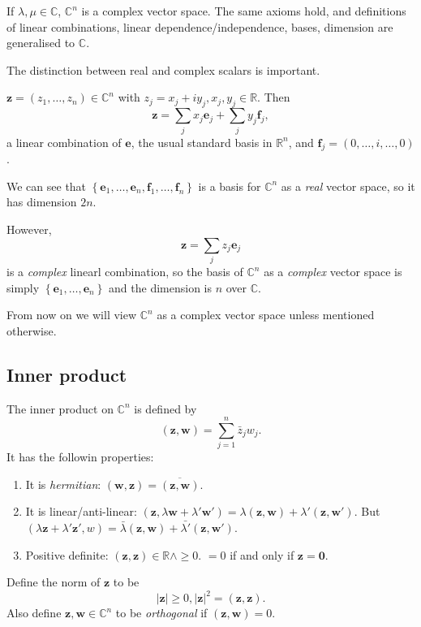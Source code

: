 \documentclass[10pt]{article}
\def\ge{\geqslant}
\begin{document}
    If $ \lambda, \mu\in \mathbb{C}  $, $ \mathbb{C}^n $ is a complex vector space. The same axioms hold, and definitions of linear combinations, linear dependence/independence, bases, dimension are generalised to $\mathbb{C}$.

    The distinction between real and complex scalars is important.
    \begin{example}
        $ \mathbf{z}=(z_1,\dots,z_n)\in \mathbb{C}^{n} $ with $ z_j=x_j+iy_j, x_j, y_j \in \mathbb{R} $. Then 
        \[
            \mathbf{z}=\sum_{j} x_j \mathbf{e}_j + \sum_{j} y_j \mathbf{f}_j,
        \]
        a linear combination of $ \mathbf{e} $, the usual standard basis in $\mathbb{R}^{n}$, and $ \mathbf{f}_j=(0,\dots,i,\dots,0) $.
    \end{example}
    We can see that $ \left\{ \mathbf{e}_1,\dots,\mathbf{e}_n,\mathbf{f}_1,\dots,\mathbf{f}_n\right\} $ is a basis for $\mathbb{C}^{n}$ as a \textit{real} vector space, so it has dimension $2n$.
    
    However,
    \[
        \mathbf{z}=\sum_{j}z_j \mathbf{e}_j
    \]
    is a \textit{complex} linearl combination, so the basis of $ \mathbb{C}^{n} $ as a \textit{complex} vector space is simply $ \left\{ \mathbf{e}_1,\dots,\mathbf{e}_n\right\} $ and the dimension is $n$ over $ \mathbb{C} $.

    From now on we will view $ \mathbb{C}^{n} $ as a complex vector space unless mentioned otherwise.
    \subsection{Inner product}
    The inner product on $ \mathbb{C}^{n} $ is defined by 
    \[
        (\mathbf{z},\mathbf{w})=\sum_{j=1}^n \bar{z}_j w_j
    .\]
    It has the followin properties:
    \begin{enumerate}[(1)]
        \item It is \textit{hermitian}: $ (\mathbf{w},\mathbf{z})=\overline{(\mathbf{z},\mathbf{w})} $.
        \item It is linear/anti-linear: $ (\mathbf{z}, \lambda \mathbf{w} +\lambda' \mathbf{w}')=\lambda(\mathbf{z},\mathbf{w})+\lambda'(\mathbf{z},\mathbf{w}') $. But $ (\lambda \mathbf{z}+\lambda' \mathbf{z}',w)=\bar{\lambda}(\mathbf{z},\mathbf{w})+\bar{\lambda'}(\mathbf{z},\mathbf{w}') $.
        \item Positive definite: $ (\mathbf{z},\mathbf{z})\in \mathbb{R} \land \ge 0 $. $ =0 $ if and only if $ \mathbf{z}=\mathbf{0} $.
    \end{enumerate}
    Define the norm of $ \mathbf{z} $ to be 
    \[
        \left| \mathbf{z} \right| \ge 0, |\mathbf{z}|^2=(\mathbf{z},\mathbf{z})
    .\]
    Also define $ \mathbf{z}, \mathbf{w}\in \mathbb{C}^{n} $ to be \textit{orthogonal} if $ (\mathbf{z},\mathbf{w})=0. $
\end{document}

